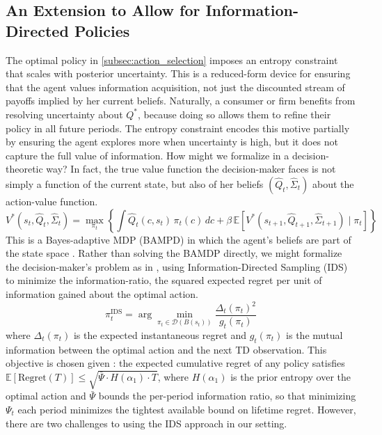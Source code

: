 \subsection{An Extension to Allow for Information-Directed Policies} \label{subsec:information_directed_policies}

The optimal policy in \ref{subsec:action_selection} imposes an entropy
constraint that scales with posterior uncertainty. This is a reduced-form device
for ensuring that the agent values information acquisition, not just the
discounted stream of payoffs implied by her current beliefs.  
Naturally, a consumer or firm benefits from resolving uncertainty about
$Q^*$, because doing so allows them to refine their policy in all future periods. 
The entropy constraint encodes this motive partially by ensuring the agent explores 
more when uncertainty is high, but it does not capture the full value of information.
How might we formalize in a decision-theoretic way? In fact, the true value function the decision-maker faces
is not simply a function of the current state, but also of her beliefs $(\hat{Q}_t, \hat{\Sigma}_t)$
about the action-value function.
\begin{equation}
    V^*(s_t, \hat{Q}_t, \hat{\Sigma}_t)
    = \max_{\pi_t} \left\{
        \int \hat{Q}_t(c, s_t) \, \pi_t(c) \, dc
        + \beta \, \mathbb{E}\!\left[
            V^*(s_{t+1}, \hat{Q}_{t+1}, \hat{\Sigma}_{t+1})
            \;\Big|\; \pi_t
        \right]
    \right\}
    \label{eq:belief_bellman}
\end{equation}
This is a Bayes-adaptive MDP (BAMPD) in which the agent's beliefs are part of the state 
space \citet{duff2002}. Rather than solving the BAMDP directly, we might formalize the 
decision-maker's problem as in \cite{RussoVanRoy2014,RussoVanRoy2017},
using Information-Directed Sampling (IDS) to minimize the information-ratio, the 
squared expected regret per unit of information gained about the optimal action.
\begin{equation}
    \pi_t^{\mathrm{IDS}} = \arg\min_{\pi_t \in \mathcal{D}(B(s_t))}
    \frac{\Delta_t(\pi_t)^2}{g_t(\pi_t)}
\end{equation}
where $\Delta_t(\pi_t)$ is the expected instantaneous
regret and $g_t(\pi_t)$ is the mutual information between the optimal action and
the next TD observation. This objective is chosen given
\cite{RussoVanRoy2017}: the expected cumulative regret of any policy satisfies
$\mathbb{E}[\mathrm{Regret}(T)] \leq \sqrt{\bar{\Psi} \cdot H(\alpha_1) \cdot T}$, where
$H(\alpha_1)$ is the prior entropy over the optimal action
and $\bar{\Psi}$ bounds the per-period information ratio,
so that minimizing $\Psi_t$ each period minimizes the
tightest available bound on lifetime regret. However, there are two challenges
to using the IDS approach in our setting.

